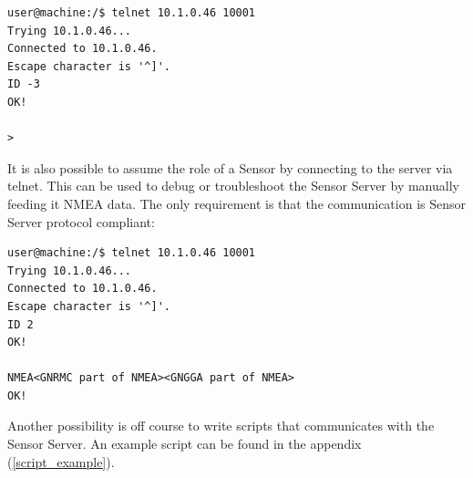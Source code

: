 \documentclass[12pt,english,a4paper]{report}
\begin{document}
\begin{lstlisting}
user@machine:/$ telnet 10.1.0.46 10001
Trying 10.1.0.46...
Connected to 10.1.0.46.
Escape character is '^]'.
ID -3
OK!

>
\end{lstlisting}
It is also possible to assume the role of a Sensor by connecting to the server via telnet. This can be used to debug or troubleshoot the Sensor Server by manually feeding it NMEA data. The only requirement is that the communication is Sensor Server protocol compliant:

\begin{lstlisting}
user@machine:/$ telnet 10.1.0.46 10001
Trying 10.1.0.46...
Connected to 10.1.0.46.
Escape character is '^]'.
ID 2
OK!

NMEA<GNRMC part of NMEA><GNGGA part of NMEA>
OK!
\end{lstlisting}
Another possibility is off course to write scripts that communicates with the Sensor Server. An example script can be found in the appendix (\ref{script_example}).
\end{document}
